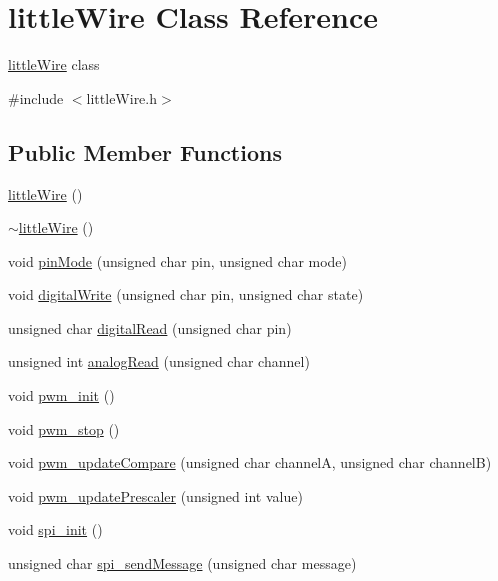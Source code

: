 \hypertarget{classlittleWire}{\section{little\-Wire \-Class \-Reference}
\label{classlittleWire}
}


\hyperlink{classlittleWire}{little\-Wire} class  




{\ttfamily \#include $<$little\-Wire.\-h$>$}

\subsection*{\-Public \-Member \-Functions}
\begin{DoxyCompactItemize}
\item 
\hyperlink{classlittleWire_a48b8616a5add99022a556a9a839e31b2}{little\-Wire} ()
\item 
\hyperlink{classlittleWire_ae18d45d978ab1862b98db53d7e2634b1}{$\sim$little\-Wire} ()
\item 
void \hyperlink{group__GPIO_gaf657af6bcf549893b5fd7df1049dabc8}{pin\-Mode} (unsigned char pin, unsigned char mode)
\item 
void \hyperlink{group__GPIO_ga896fb0c440930e3e7ea8ed39577338a2}{digital\-Write} (unsigned char pin, unsigned char state)
\item 
unsigned char \hyperlink{group__GPIO_ga203436de9031afe3e82412f6d2045fe1}{digital\-Read} (unsigned char pin)
\item 
unsigned int \hyperlink{group__ADC_ga7167a646d71cc3ad8700c0d084d1c22a}{analog\-Read} (unsigned char channel)
\item 
void \hyperlink{group__PWM_gacf483e7e2f583aa03f3c04b7679f8154}{pwm\-\_\-init} ()
\item 
void \hyperlink{group__PWM_gae271ef531c63a6c4739ac0b74f6a9b32}{pwm\-\_\-stop} ()
\item 
void \hyperlink{group__PWM_ga49de16d3d4d1d12ff9be1e86fbdf4d77}{pwm\-\_\-update\-Compare} (unsigned char channel\-A, unsigned char channel\-B)
\item 
void \hyperlink{group__PWM_ga00985706f6aa20cad938832f6d3303d7}{pwm\-\_\-update\-Prescaler} (unsigned int value)
\item 
void \hyperlink{group__SPI_ga5ccf0433ba234ff754d8c8c18009684a}{spi\-\_\-init} ()
\item 
unsigned char \hyperlink{group__SPI_ga842fef3abf87f0e5afcc5406609f4858}{spi\-\_\-send\-Message} (unsigned char message)

\end{DoxyCompactItemize}
